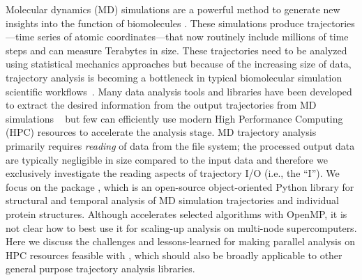 \label{sec:introduction}
Molecular dynamics (MD) simulations are a powerful method to generate new insights into the function of biomolecules \citep{Borhani:2012mi, Dror:2012cr, Orozco:2014dq, Perilla:2015kx, Bottaro:2018aa}.
These simulations produce trajectories---time series of atomic coordinates---that now routinely include millions of time steps and can measure Terabytes in size.
These trajectories need to be analyzed using statistical mechanics approaches \cite{Tuckerman:2010cr, Mura:2014kx} but because of the increasing size of data, trajectory analysis is becoming a bottleneck in typical biomolecular simulation scientific workflows~\cite{Cheatham:2015}.
Many data analysis tools and libraries have been developed to extract the desired information from the output trajectories from MD simulations ~\cite{nmoldyn, nmoldyn-2012, Hum96, Hinsen:2000kx, Grant:2006ud, himach-2008, Romo:2009zr, Romo:2014bh, Michaud-Agrawal:2011fu, Gowers:2016aa, cpptraj-2013, mdtraj-2015, pteros2015, Doerr:2016aa} but few can efficiently use modern High Performance Computing (HPC) resources to accelerate the analysis stage.
MD trajectory analysis primarily requires \emph{reading} of data from the file system; the processed output data are typically negligible in size compared to the input data and therefore we exclusively investigate the reading aspects of trajectory I/O (i.e., the ``I'').
We focus on the  package \cite{Gowers:2016aa,Michaud-Agrawal:2011fu}, which is an open-source object-oriented Python library for structural and temporal analysis of MD simulation trajectories and individual protein structures.
Although  accelerates selected algorithms with OpenMP, it is not clear how to best use it for scaling-up analysis on multi-node supercomputers.
Here we discuss the challenges and lessons-learned for making parallel analysis on HPC resources feasible with , which should also be broadly applicable to other general purpose trajectory analysis libraries.

